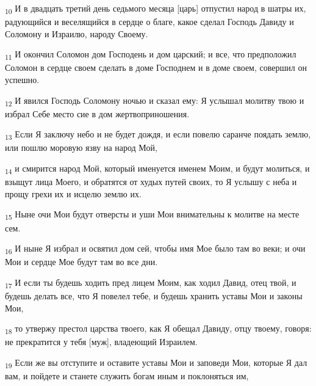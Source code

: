 \begin{tcolorbox}
\textsubscript{10} И в двадцать третий день седьмого месяца [царь] отпустил народ в шатры их, радующийся и веселящийся в сердце о благе, какое сделал Господь Давиду и Соломону и Израилю, народу Своему.
\end{tcolorbox}
\begin{tcolorbox}
\textsubscript{11} И окончил Соломон дом Господень и дом царский; и все, что предположил Соломон в сердце своем сделать в доме Господнем и в доме своем, совершил он успешно.
\end{tcolorbox}
\begin{tcolorbox}
\textsubscript{12} И явился Господь Соломону ночью и сказал ему: Я услышал молитву твою и избрал Себе место сие в дом жертвоприношения.
\end{tcolorbox}
\begin{tcolorbox}
\textsubscript{13} Если Я заключу небо и не будет дождя, и если повелю саранче поядать землю, или пошлю моровую язву на народ Мой,
\end{tcolorbox}
\begin{tcolorbox}
\textsubscript{14} и смирится народ Мой, который именуется именем Моим, и будут молиться, и взыщут лица Моего, и обратятся от худых путей своих, то Я услышу с неба и прощу грехи их и исцелю землю их.
\end{tcolorbox}
\begin{tcolorbox}
\textsubscript{15} Ныне очи Мои будут отверсты и уши Мои внимательны к молитве на месте сем.
\end{tcolorbox}
\begin{tcolorbox}
\textsubscript{16} И ныне Я избрал и освятил дом сей, чтобы имя Мое было там во веки; и очи Мои и сердце Мое будут там во все дни.
\end{tcolorbox}
\begin{tcolorbox}
\textsubscript{17} И если ты будешь ходить пред лицем Моим, как ходил Давид, отец твой, и будешь делать все, что Я повелел тебе, и будешь хранить уставы Мои и законы Мои,
\end{tcolorbox}
\begin{tcolorbox}
\textsubscript{18} то утвержу престол царства твоего, как Я обещал Давиду, отцу твоему, говоря: не прекратится у тебя [муж], владеющий Израилем.
\end{tcolorbox}
\begin{tcolorbox}
\textsubscript{19} Если же вы отступите и оставите уставы Мои и заповеди Мои, которые Я дал вам, и пойдете и станете служить богам иным и поклоняться им,
\end{tcolorbox}
